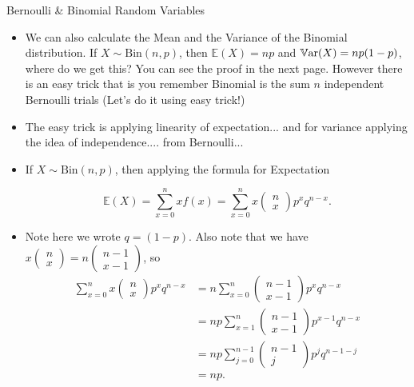 \documentclass[8pt, usepdftitle = false]{beamer}
\begin{document}
\begin{frame}[allowframebreaks]{Bernoulli \& Binomial Random Variables}
\begin{itemize}
\item We can also calculate the Mean and the Variance of the Binomial distribution. \alert{If $X \sim \textrm{Bin}(n, p)$, then $\mathbb{E}(X) = np$ and $\mathbb{V}\mathrm{ar}{(}X) = np(1-p)$}, where do we get this? You can see the proof in the next page. However there is an easy trick that is you remember Binomial is the sum $n$ independent Bernoulli trials (Let's do it using easy trick!)


\item The easy trick is applying linearity of expectation... and for variance applying the idea of independence.... from Bernoulli...

\framebreak


\item If $X \sim \mathrm{Bin}(n, p)$, then applying the formula for Expectation

$$
\mathbb{E}(X)=\sum_{x=0}^n x f(x)=\sum_{x=0}^n x\left(\begin{array}{l}
n \\
x
\end{array}\right) p^x q^{n-x} .
$$

\item Note here we wrote $q = (1-p)$. Also note that we have $x\left(\begin{array}{c}n \\ x\end{array}\right)=n\left(\begin{array}{c}n-1 \\ x-1\end{array}\right)$, so
$$
\begin{aligned}
\sum_{x=0}^n x\left(\begin{array}{l}
n \\
x
\end{array}\right) p^x q^{n-x} &=n \sum_{x=0}^n\left(\begin{array}{c}
n-1 \\
x-1
\end{array}\right) p^x q^{n-x} \\
&=n p \sum_{x=1}^n\left(\begin{array}{c}
n-1 \\
x-1
\end{array}\right) p^{x-1} q^{n-x} \\
&=n p \sum_{j=0}^{n-1}\left(\begin{array}{c}
n-1 \\
j
\end{array}\right) p^j q^{n-1-j} \\
&=n p .
\end{aligned}
$$


\end{itemize}
\end{frame}
\end{document}
